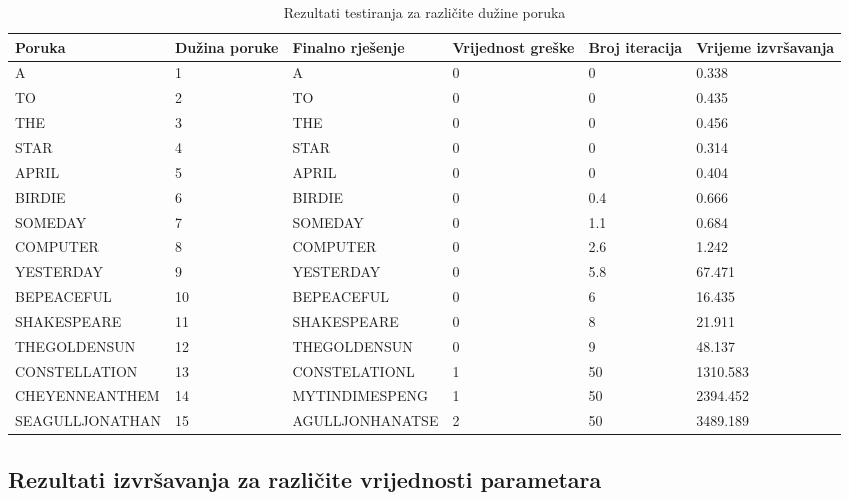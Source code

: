 \documentclass[12pt, a4paper]{article}
\begin{document}
\begin{table}[H]
\centering
\begin{tabular}{ | l | p{1.5 cm} | l | p{2 cm} | p{1.5 cm} | p{1.5 cm} |} \hline
\textbf{Poruka} 			& \textbf{Dužina poruke}	& \textbf{Finalno rješenje}		& \textbf{Vrijednost greške} 	& \textbf{Broj iteracija}	& \textbf{Vrijeme izvršavanja}	\\ \hline
A 						& 1						& A 						& 0							& 0						& 0.338						\\ \hline
TO 						& 2						& TO 						& 0							& 0						& 0.435						\\ \hline
THE						& 3						& THE						& 0							& 0						& 0.456 						\\ \hline
STAR					& 4						& STAR						& 0							& 0						& 0.314						\\ \hline
APRIL					& 5						& APRIL						& 0							& 0						& 0.404						\\ \hline
BIRDIE					& 6						& BIRDIE					& 0							& 0.4					& 0.666						\\ \hline
SOMEDAY				& 7						& SOMEDAY					& 0							& 1.1					& 0.684						\\ \hline
COMPUTER				& 8						& COMPUTER				& 0							& 2.6					& 1.242						\\ \hline
YESTERDAY				& 9						& YESTERDAY				& 0							& 5.8					& 67.471					\\ \hline
BEPEACEFUL				& 10					& BEPEACEFUL				& 0							& 6						& 16.435					\\ \hline
SHAKESPEARE			& 11					& SHAKESPEARE 				& 0							& 8						& 21.911					\\ \hline
THEGOLDENSUN			& 12					& THEGOLDENSUN			& 0							& 9						& 48.137					\\ \hline
CONSTELLATION			& 13					& CONSTELATIONL			& 1							& 50					& 1310.583					\\ \hline
CHEYENNEANTHEM		& 14					& MYTINDIMESPENG	 		& 1							& 50					& 2394.452					\\ \hline
SEAGULLJONATHAN		& 15					& AGULLJONHANATSE 		& 2							& 50					& 3489.189					\\ \hline
\end{tabular}
\caption{Rezultati testiranja za različite dužine poruka}
\label{poruke}
\end{table}

\subsection{Rezultati izvršavanja za različite vrijednosti parametara}
\end{document}
